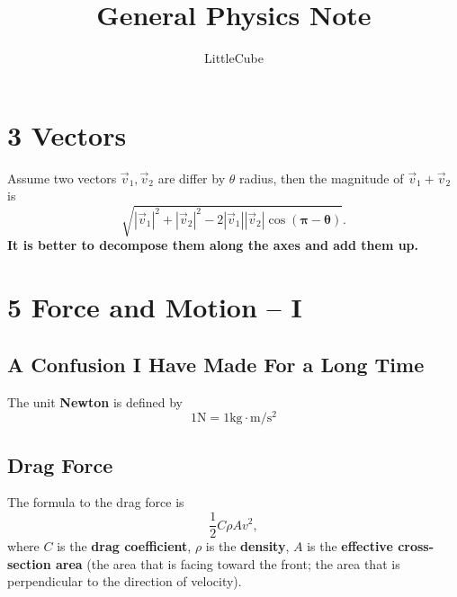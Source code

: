 \documentclass[12pt,a4paper]{report}
\begin{document}
  \title{General Physics Note}
  \author{LittleCube \Huge{}}

  \maketitle

  \section*{3 Vectors}
  Assume two vectors \(\vec v_1,\vec v_2\) are differ by \(\theta\) radius, then the magnitude of \(\vec v_1 + \vec v_2\) is  
  \[\sqrt{ |\vec v_1|^2 + |\vec v_2|^2 - 2|\vec v_1| |\vec v_2| \cos \boldsymbol{(\pi - \theta)}}.\]
  \textbf{It is better to decompose them along the axes and add them up.}


  \section*{5 Force and Motion -- I}
  \subsection*{A Confusion I Have Made For a Long Time}

  The unit \textbf{Newton} is defined by
  \[1 \mathrm{N} = 1 \mathrm{kg \cdot m/s^2}\]
  
  \subsection*{Drag Force}
  The formula to the drag force is
  \[\frac 1 2 C \rho A v^2,\]
  where \(C\) is the \textbf{drag coefficient}, \(\rho\) is the \textbf{density}, \(A\) is the \textbf{effective cross-section area} (the area that is facing toward the front; the area that is perpendicular to the direction of velocity).
\end{document}
